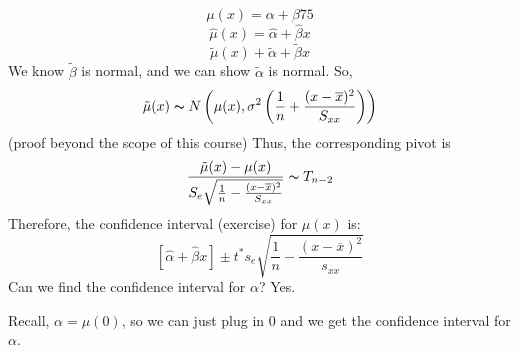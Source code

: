 \[ \mu(x)=\alpha+\beta 75 \]
\[ \hat{\mu}(x)=\hat{\alpha}+\hat{\beta}x \]
\[ \tilde{\mu}(x)+\tilde{\alpha}+\tilde{\beta}x \]
We know $ \tilde{\beta} $ is normal, and we can show $ \tilde{\alpha} $ is normal.
So,
\[ \tilde{\mu}(x) \thicksim N \left( \mu(x),\sigma^2
    \left( \frac{1}{n} +\frac{(x-\overline{x})^2}{S_{xx}} \right) \right) \]
(proof beyond the scope of this course)
Thus, the corresponding pivot is
\[ \frac{\tilde{\mu}(x)-\mu(x)}{S_{e}\sqrt{\frac{1}{n}-\frac{(x-\overline{x})^2}{S_{xx}}}}
    \thicksim T_{n-2} \]
Therefore, the confidence interval (exercise) for $ \mu(x) $ is:
\[ \left[ \hat{\alpha}+\hat{\beta}x \right]
    \pm
    t^* s_e \sqrt{\frac{1}{n}-\frac{(x-\overline{x})^2}{s_{xx}}} \]
Can we find the confidence interval for $ \alpha $? Yes.

Recall, $ \alpha=\mu(0) $, so we can just plug in $ 0 $ and we get the confidence
interval for $ \alpha $.
